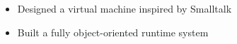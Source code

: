 \begin{itemize}
  \item Designed a virtual machine inspired by Smalltalk
  \item Built a fully object-oriented runtime system
\end{itemize}
\vspace{4pt}
